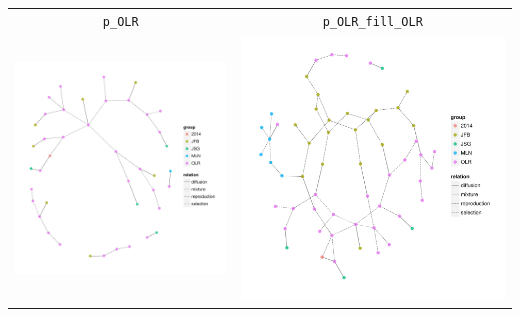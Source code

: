 \documentclass{article}\usepackage[]{graphicx}\usepackage[]{color}
\newenvironment{knitrout}{}{} %
\begin{document}
\begin{center}
\begin{tabular}{cc}
\texttt{p\_OLR} & \texttt{p\_OLR\_fill\_OLR} \\
\begin{knitrout}
\definecolor{shadecolor}{rgb}{0.969, 0.969, 0.969}\color{fgcolor}

{\centering \includegraphics[width=.5\textwidth]{figures/shinemas2R_unnamed-chunk-28-1} 

}



\end{knitrout}
&
\begin{knitrout}
\definecolor{shadecolor}{rgb}{0.969, 0.969, 0.969}\color{fgcolor}

{\centering \includegraphics[width=.5\textwidth]{figures/shinemas2R_unnamed-chunk-29-1} 

}



\end{knitrout}
\\
\end{tabular}
\end{center}
\end{document}
